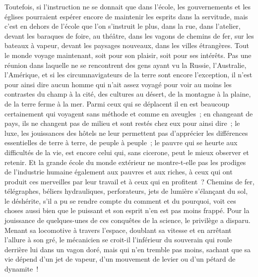 \documentclass[french,twoside]{book} %
\begin{document}
Toutefois, si l’instruction ne se donnait que dans l’école, les gouvernements  et les églises pourraient espérer encore de maintenir les esprits dans la servitude, mais c’est en dehors de l’école que l’on s’instruit le plus, dans la rue, dans l’atelier, devant les baraques de foire, au théâtre, dans les vagons de chemins de fer, sur les bateaux à vapeur, devant les paysages nouveaux, dans les villes étrangères. Tout le monde voyage maintenant, soit pour son plaisir, soit pour ses intérêts. Pas une réunion dans laquelle ne se rencontrent des gens ayant vu la Russie, l’Australie, l’Amérique, et si les circumnavigateurs de la terre sont encore l’exception, il n’est pour ainsi dire aucun homme qui n’ait assez voyagé pour voir au moins les contrastes du champ à la cité, des cultures au désert, de la montagne à la plaine, de la terre ferme à la mer.  Parmi ceux qui se déplacent il en est beaucoup certainement qui voyagent sans méthode et comme en aveugles ; en changeant de pays, ils ne changent pas de milieu et sont restés chez eux pour ainsi dire ; le luxe, les jouissances des hôtels ne leur permettent pas d’apprécier les différences essentielles de terre à terre, de peuple à peuple ; le pauvre qui se heurte aux difficultés de la vie, est encore celui qui, sans cicerone, peut le mieux observer et retenir. Et la grande école du monde extérieur ne montre-t-elle pas les prodiges de l’industrie humaine également aux pauvres et aux riches, à ceux qui ont produit ces merveilles par leur travail et à ceux qui en profitent ? Chemins de fer, télégraphes, béliers hydrauliques, perforateurs, jets de lumière s’élançant du sol, le déshérite,  s’il a pu se rendre compte du comment et du pourquoi, voit ces choses aussi bien que le puissant et son esprit n’en est pas moins frappé. Pour la jouissance de quelques-unes de ces conquêtes de la science, le privilège a disparu. Menant sa locomotive à travers l’espace, doublant sa vitesse et en arrêtant l’allure à son gré, le mécanicien se croit-il l’inférieur du souverain qui roule derrière lui dans un vagon doré, mais qui n’en tremble pas moins, sachant que sa vie dépend d’un jet de vapeur, d’un mouvement de levier ou d’un pétard de dynamite !\par
\end{document}
